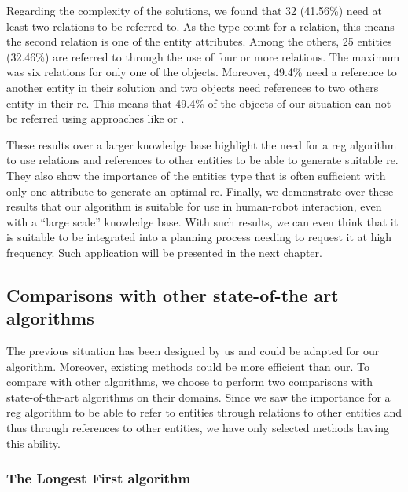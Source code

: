 Regarding the complexity of the solutions, we found that 32 (41.56\%) need at least two relations to be referred to. As the type count for a relation, this means the second relation is one of the entity attributes. Among the others, 25 entities (32.46\%) are referred to through the use of four or more relations. The maximum was six relations for only one of the objects. Moreover, 49.4\% need a reference to another entity in their solution and two objects need references to two others entity in their \acrshort{re}. This means that 49.4\% of the objects of our situation can not be referred using approaches like \cite{ros_2010_which} or \cite{dale_1995_computational}.

These results over a larger knowledge base highlight the need for a \acrshort{reg} algorithm to use relations and references to other entities to be able to generate suitable \acrshort{re}. They also show the importance of the entities type that is often sufficient with only one attribute to generate an optimal \acrshort{re}. Finally, we demonstrate over these results that our algorithm is suitable for use in human-robot interaction, even with a ``large scale'' knowledge base. With such results, we can even think that it is suitable to be integrated into a planning process needing to request it at high frequency. Such application will be presented in the next chapter.


\subsection{Comparisons with other state-of-the art algorithms}

The previous situation has been designed by us and could be adapted for our algorithm. Moreover, existing methods could be more efficient than our. To compare with other algorithms, we choose to perform two comparisons with state-of-the-art algorithms on their domains. Since we saw the importance for a \acrshort{reg} algorithm to be able to refer to entities through relations to other entities and thus through references to other entities, we have only selected methods having this ability.

\subsubsection{The Longest First algorithm}

